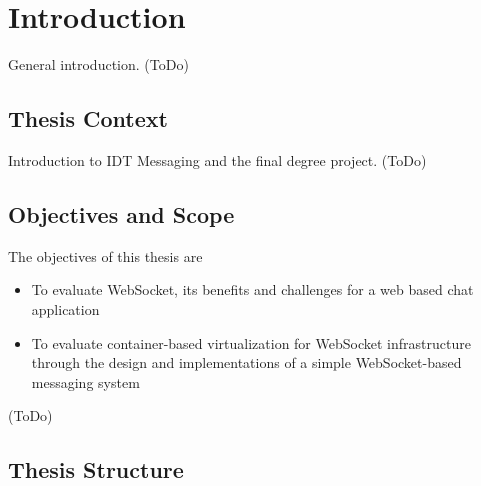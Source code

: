 \chapter{Introduction}
\label{chapter:intro}

General introduction. (ToDo)

\section{Thesis Context}

Introduction to IDT Messaging and the final degree project. (ToDo)

\section{Objectives and Scope}

The objectives of this thesis are

\begin{itemize}
\item To evaluate WebSocket, its benefits and challenges for a web based chat application
\item To evaluate container-based virtualization for WebSocket infrastructure through the design and implementations of a simple WebSocket-based messaging system
\end{itemize}

(ToDo)

\section{Thesis Structure}

